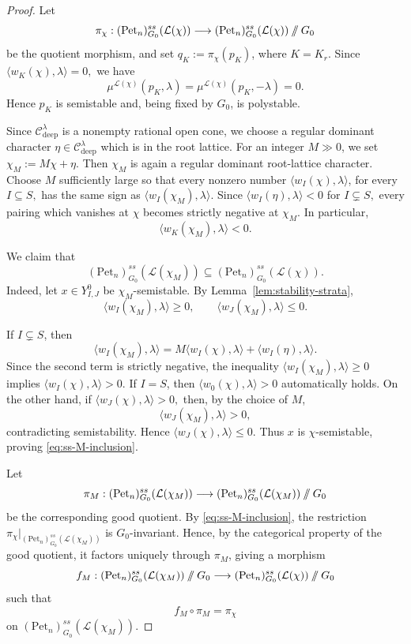 \documentclass[12pt, reqno]{amsart}
\newcommand{\sslash}{\mathbin{/\mkern-6mu/}}
\theoremstyle{plain}
\numberwithin{equation}{section}
\theoremstyle{definition}
\begin{document}
\begin{proof} 
Let
\[
\pi_\chi:
(\mathrm{Pet}_n)^{ss}_{G_0}(\mathcal L(\chi))
\longrightarrow
(\mathrm{Pet}_n)^{ss}_{G_0}(\mathcal L(\chi))
\sslash G_0
\]
be the quotient morphism, and set $q_K:=\pi_\chi(p_K)$, where $K=K_r$.
Since $\langle w_K(\chi),\lambda\rangle=0,$
we have
\[
\mu^{\mathcal L(\chi)}(p_K,\lambda)
=
\mu^{\mathcal L(\chi)}(p_K,-\lambda)
=
0.
\]
Hence \(p_K\) is semistable and, being fixed by \(G_0\), is
polystable.


Since
\(\mathcal C^\lambda_{\mathrm{deep}}\) is a nonempty rational open
cone, we choose a regular dominant character $\eta\in\mathcal C^\lambda_{\mathrm{deep}}$ which is in the root lattice. For an integer \(M\gg0\), we set $\chi_M:=M\chi+\eta.$
Then \(\chi_M\) is again a regular dominant root-lattice character.
Choose \(M\) sufficiently large so that every nonzero number $\langle w_I(\chi),\lambda\rangle$, for every $I\subseteq S,$
has the same sign as $\langle w_I(\chi_M),\lambda\rangle.$ Since $\langle w_I(\eta),\lambda\rangle<0$ for $I\subsetneq S,$
every pairing which vanishes at \(\chi\) becomes strictly negative
at \(\chi_M\). In particular,
\begin{equation}\label{eq:K-negative-perturbation}
\langle w_K(\chi_M),\lambda\rangle<0.
\end{equation}

We claim that
\begin{equation}\label{eq:ss-M-inclusion}
(\mathrm{Pet}_n)^{ss}_{G_0}(\mathcal L(\chi_M))
\subseteq
(\mathrm{Pet}_n)^{ss}_{G_0}(\mathcal L(\chi)).
\end{equation}
Indeed, let $x\in Y^0_{I,J}$ be \(\chi_M\)-semistable. By
Lemma~\ref{lem:stability-strata},
\[
\langle w_I(\chi_M),\lambda\rangle\ge0,
\qquad
\langle w_J(\chi_M),\lambda\rangle\le0.
\]

If \(I\subsetneq S\), then
\[
\langle w_I(\chi_M),\lambda\rangle
=
M\langle w_I(\chi),\lambda\rangle
+
\langle w_I(\eta),\lambda\rangle.
\]
Since the second term is strictly negative, the inequality $\langle w_I(\chi_M),\lambda\rangle\ge0$ implies $\langle w_I(\chi),\lambda\rangle>0.$
If \(I=S\), then $\langle w_0(\chi),\lambda\rangle>0$
automatically holds. On the other hand, if $\langle w_J(\chi),\lambda\rangle>0,$
then, by the choice of \(M\),
\[
\langle w_J(\chi_M),\lambda\rangle>0,
\]
contradicting semistability. Hence $\langle w_J(\chi),\lambda\rangle\le0.$
Thus \(x\) is \(\chi\)-semistable, proving
\eqref{eq:ss-M-inclusion}.

Let
\[
\pi_M:
(\mathrm{Pet}_n)^{ss}_{G_0}(\mathcal L(\chi_M))
\longrightarrow
(\mathrm{Pet}_n)^{ss}_{G_0}(\mathcal L(\chi_M))
\sslash G_0
\]
be the corresponding good quotient. By
\eqref{eq:ss-M-inclusion}, the restriction $\pi_\chi\big|_
{(\mathrm{Pet}_n)^{ss}_{G_0}(\mathcal L(\chi_M))}$
is \(G_0\)-invariant. Hence, by the categorical property of the good
quotient, it factors uniquely through \(\pi_M\), giving a morphism
\[
f_M:
(\mathrm{Pet}_n)^{ss}_{G_0}(\mathcal L(\chi_M))
\sslash G_0
\longrightarrow
(\mathrm{Pet}_n)^{ss}_{G_0}(\mathcal L(\chi))
\sslash G_0
\]
such that
\[
f_M\circ\pi_M
=
\pi_\chi
\]
on
\((\mathrm{Pet}_n)^{ss}_{G_0}(\mathcal L(\chi_M))\).


\end{proof}
\end{document}
